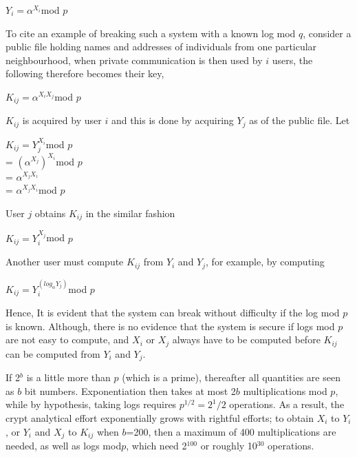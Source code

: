 \documentclass[iwp,first]{luthesis}
\begin{document}
\begin{center}
$Y_i = \alpha^{X_i}$mod $p$
\end{center}

To cite an example of breaking such a system with a known log mod $q$, consider a public file holding names and addresses of individuals from one particular neighbourhood, when private communication is then used by $i$ users, the following therefore becomes their key,

\begin{center}
$K_{ij} = \alpha^{X_{i}X_{j}}$mod $p$
\end{center}

$K_{ij}$ is acquired by user $i$ and this is done by acquiring $Y_j$ as of the public file. Let 

\begin{center}
$K_{ij} = Y_{j}^{X_{i}}$mod $p$
\\
= $(\alpha^{X_j})^{X_i}$mod $p$
\\
= $\alpha^{X_{j}X_{i}}$
\\
= $\alpha^{X_{j}X_{i}}$mod $p$
\end{center}

User $j$ obtains $K_{ij}$ in the similar fashion

\begin{center}
$K_{ij} = Y_{i}^{X_j}$mod $p$
\end{center}

Another user must compute $K_{ij}$ from $Y_{i}$ and $Y_{j}$, for example, by computing

\begin{center}
$K_{ij} = Y_{i}^{(log_{\alpha}Y_{j})}$mod $p$
\end{center}

Hence, It is evident that the system can break without difficulty if the log mod $p$ is known. Although, there is no evidence that the system is secure if logs mod $p$ are not easy to compute, and $X_i$ or $X_j$ always have to be computed before $K_{ij}$ can be computed from $Y_i$ and $Y_j$. 

If 2$^b$ is a little more than $p$ (which is a prime), thereafter all quantities are seen as $b$ bit numbers.  Exponentiation then takes at most 2$b$ multiplications mod $p$, while by hypothesis, taking logs requires $p^{1/2} = 2^1/2$ operations. As a result, the crypt analytical effort exponentially grows with rightful efforts; to obtain $X_i$ to $Y_i$, or $Y_i$ and $X_j$ to $K_{ij}$ when $b$=200, then a maximum of 400 multiplications are needed, as well as logs mod$p$, which need 2$^{100}$ or roughly 10$^{30}$ operations. 
\end{document}
